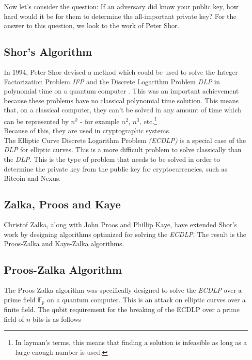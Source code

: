\documentclass[11pt]{article}
\begin{document}
\noindent Now let's consider the question: If an adversary did know your public key, how hard would it be for them to determine the all-important private key? For the answer to this question, we look to the work of Peter Shor.

\subsection{Shor's Algorithm}

\noindent In 1994, Peter Shor devised a method which could be used to solve the Integer Factorization Problem \textit{IFP} and the Discrete Logarithm Problem \textit{DLP} in polynomial time on a quantum computer \cite{shorarxiv}.
This was an important achievement because these problems have no classical polynomial time solution.
This means that, on a classical computer, they can't be solved in any amount of time which can be represented by $n^k$ - for example $n^2$, $n^3$, etc.\footnote{In layman's terms, this means that finding a solution is infeasible as long as a large enough number is used.}\\ 

\noindent Because of this, they are used in cryptographic systems.\\ 

\noindent The Elliptic Curve Discrete Logarithm Problem \textit{(ECDLP)} is a special case of the \textit{DLP} for elliptic curves.
This is a more difficult problem to solve classically than the \textit{DLP}.\cite{prooszalka} %
This is the type of problem that needs to be solved in order to determine the private key from the public key for cryptocurrencies, such as Bitcoin and Nexus.

\subsection{Zalka, Proos and Kaye}

Christof Zalka, along with John Proos and Phillip Kaye, have extended Shor's work by designing algorithms optimized for solving the \textit{ECDLP}.
The result is the Proos-Zalka and Kaye-Zalka algorithms.

\subsection{Proos-Zalka Algorithm}

The Proos-Zalka algorithm was specifically designed to solve the \textit{ECDLP} over a prime field $\mathbb{F}_p$ on a quantum computer.
This is an attack on elliptic curves over a finite field. The qubit requirement for the breaking of the ECDLP over a prime field of $n$ bits is as follows \cite{prooszalka}
\end{document}
